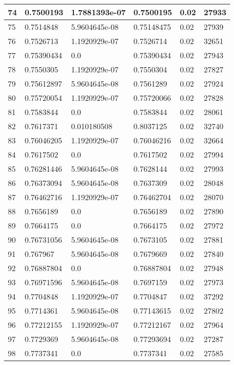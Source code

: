 \begin{longtable}{|l|l|l|l|l|l|}
74 & 0.7500193 & 1.7881393e-07 & 0.7500195 & 0.02 & 27933 \\ \hline 
75 & 0.7514848 & 5.9604645e-08 & 0.75148475 & 0.02 & 27939 \\ \hline 
76 & 0.7526713 & 1.1920929e-07 & 0.7526714 & 0.02 & 32651 \\ \hline 
77 & 0.75390434 & 0.0 & 0.75390434 & 0.02 & 27943 \\ \hline 
78 & 0.7550305 & 1.1920929e-07 & 0.7550304 & 0.02 & 27827 \\ \hline 
79 & 0.75612897 & 5.9604645e-08 & 0.7561289 & 0.02 & 27924 \\ \hline 
80 & 0.75720054 & 1.1920929e-07 & 0.75720066 & 0.02 & 27828 \\ \hline 
81 & 0.7583844 & 0.0 & 0.7583844 & 0.02 & 28061 \\ \hline 
82 & 0.7617371 & 0.010180508 & 0.8037125 & 0.02 & 32740 \\ \hline 
83 & 0.76046205 & 1.1920929e-07 & 0.76046216 & 0.02 & 32664 \\ \hline 
84 & 0.7617502 & 0.0 & 0.7617502 & 0.02 & 27994 \\ \hline 
85 & 0.76281446 & 5.9604645e-08 & 0.7628144 & 0.02 & 27993 \\ \hline 
86 & 0.76373094 & 5.9604645e-08 & 0.7637309 & 0.02 & 28048 \\ \hline 
87 & 0.76462716 & 1.1920929e-07 & 0.76462704 & 0.02 & 28070 \\ \hline 
88 & 0.7656189 & 0.0 & 0.7656189 & 0.02 & 27890 \\ \hline 
89 & 0.7664175 & 0.0 & 0.7664175 & 0.02 & 27972 \\ \hline 
90 & 0.76731056 & 5.9604645e-08 & 0.7673105 & 0.02 & 27881 \\ \hline 
91 & 0.767967 & 5.9604645e-08 & 0.7679669 & 0.02 & 27840 \\ \hline 
92 & 0.76887804 & 0.0 & 0.76887804 & 0.02 & 27948 \\ \hline 
93 & 0.76971596 & 5.9604645e-08 & 0.7697159 & 0.02 & 27973 \\ \hline 
94 & 0.7704848 & 1.1920929e-07 & 0.7704847 & 0.02 & 37292 \\ \hline 
95 & 0.7714361 & 5.9604645e-08 & 0.77143615 & 0.02 & 27802 \\ \hline 
96 & 0.77212155 & 1.1920929e-07 & 0.77212167 & 0.02 & 27964 \\ \hline 
97 & 0.7729369 & 5.9604645e-08 & 0.77293694 & 0.02 & 27287 \\ \hline 
98 & 0.7737341 & 0.0 & 0.7737341 & 0.02 & 27585 \\ \hline 

\end{longtable}
